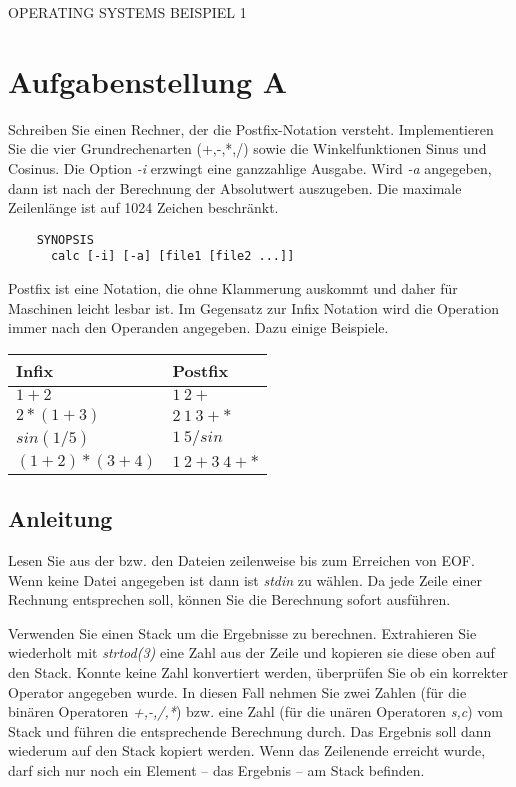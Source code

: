 \documentclass{article}
\begin{document}
\begin{center}
\begin{Large}
OPERATING SYSTEMS BEISPIEL 1
\end{Large}
\end{center}


\section*{Aufgabenstellung A}
Schreiben Sie einen Rechner, der die Postfix-Notation versteht. 
Implementieren Sie die vier Grundrechenarten (+,-,*,/) sowie die Winkelfunktionen Sinus und Cosinus. 
Die Option \emph{-i} erzwingt eine ganzzahlige Ausgabe. Wird \emph{-a} angegeben, 
dann ist nach der Berechnung der Absolutwert auszugeben. Die maximale Zeilenlänge ist auf 1024 Zeichen beschränkt.

\begin{verbatim}
	SYNOPSIS
	  calc [-i] [-a] [file1 [file2 ...]]
\end{verbatim}

Postfix ist eine Notation, die ohne Klammerung auskommt und daher für Maschinen leicht lesbar ist. Im Gegensatz zur Infix Notation wird die Operation immer nach den Operanden angegeben. Dazu einige Beispiele.

\begin{tabular}{ll}
\hline
Infix & Postfix \\ \hline
$1+2$ & $1\:2 + $ \\
$2*(1+3)$ & $2\:1\:3 + * $ \\
$sin(1/5)$ & $1\:5 / sin $ \\ 
$(1+2)*(3+4)$ & $1\:2 + 3\:4 + *$ \\
\hline
\end{tabular}

\subsection*{Anleitung}
Lesen Sie aus der bzw. den Dateien zeilenweise bis zum Erreichen von EOF. Wenn keine Datei angegeben ist dann ist \emph{stdin} zu wählen.
Da jede Zeile einer Rechnung entsprechen soll, können Sie die Berechnung sofort ausführen.

Verwenden Sie einen Stack um die Ergebnisse zu berechnen. 
Extrahieren Sie wiederholt mit \emph{strtod(3)} eine Zahl aus der Zeile und kopieren sie diese oben auf den Stack. Konnte keine Zahl konvertiert werden, überprüfen Sie ob ein korrekter Operator angegeben wurde. In diesen Fall nehmen Sie zwei Zahlen (für die binären Operatoren \emph{+,-,/,*}) bzw. eine Zahl (für die unären Operatoren \emph{s,c}) vom Stack und führen die entsprechende Berechnung durch. Das Ergebnis soll dann wiederum auf den Stack kopiert werden.
Wenn das Zeilenende erreicht wurde, darf sich nur noch ein Element -- das Ergebnis -- am Stack befinden.   
\end{document}
